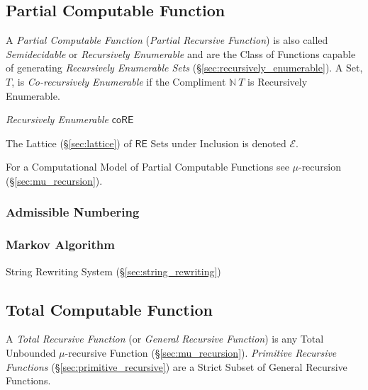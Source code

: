 \subsection{Partial Computable Function}\label{sec:partial_computable}

A \emph{Partial Computable Function} (\emph{Partial Recursive
  Function}) is also called \emph{Semidecidable} or \emph{Recursively
  Enumerable} and are the Class of Functions capable of generating
\emph{Recursively Enumerable Sets}
(\S\ref{sec:recursively_enumerable}). A Set, $T$, is
\emph{Co-recursively Enumerable} if the Compliment $\mathbb{N} \ T$ is
Recursively Enumerable.

\emph{Recursively Enumerable} $\mathsf{coRE}$

The Lattice (\S\ref{sec:lattice}) of $\mathsf{RE}$ Sets under
Inclusion is denoted $\mathcal{E}$.

For a Computational Model of Partial Computable Functions see
$\mu$-recursion (\S\ref{sec:mu_recursion}).



\subsubsection{Admissible Numbering}\label{sec:admissible_numbering}

\subsubsection{Markov Algorithm}\label{sec:markov_algorithm}

String Rewriting System (\S\ref{sec:string_rewriting})



\subsection{Total Computable Function}\label{sec:total_computable}

A \emph{Total Recursive Function} (or \emph{General Recursive
  Function}) is any Total Unbounded $\mu$-recursive Function
(\S\ref{sec:mu_recursion}). \emph{Primitive Recursive Functions}
(\S\ref{sec:primitive_recursive}) are a Strict Subset of General
Recursive Functions.



